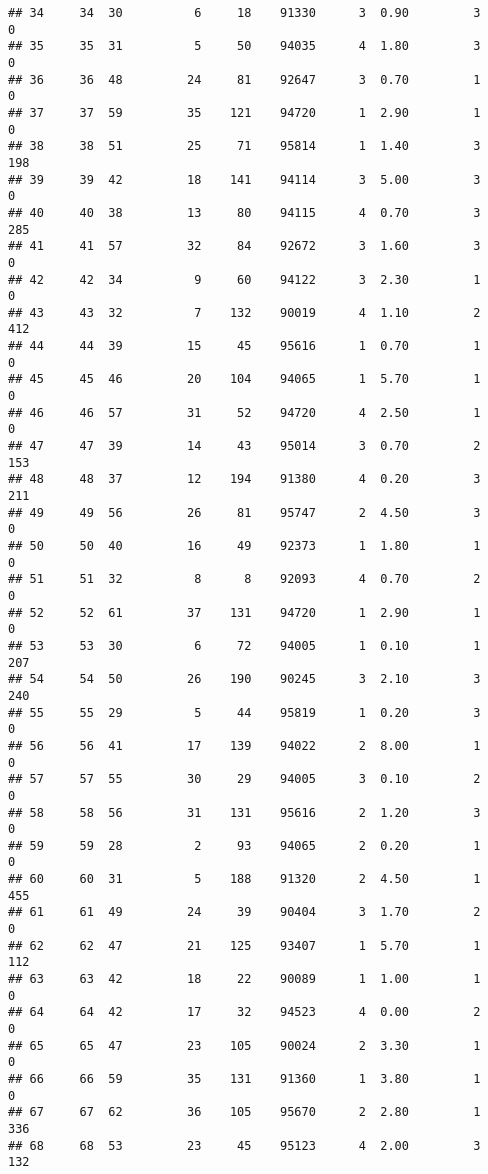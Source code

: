 \documentclass[
]{article}
\begin{document}
\begin{verbatim}
## 34     34  30          6     18    91330      3  0.90         3        0
## 35     35  31          5     50    94035      4  1.80         3        0
## 36     36  48         24     81    92647      3  0.70         1        0
## 37     37  59         35    121    94720      1  2.90         1        0
## 38     38  51         25     71    95814      1  1.40         3      198
## 39     39  42         18    141    94114      3  5.00         3        0
## 40     40  38         13     80    94115      4  0.70         3      285
## 41     41  57         32     84    92672      3  1.60         3        0
## 42     42  34          9     60    94122      3  2.30         1        0
## 43     43  32          7    132    90019      4  1.10         2      412
## 44     44  39         15     45    95616      1  0.70         1        0
## 45     45  46         20    104    94065      1  5.70         1        0
## 46     46  57         31     52    94720      4  2.50         1        0
## 47     47  39         14     43    95014      3  0.70         2      153
## 48     48  37         12    194    91380      4  0.20         3      211
## 49     49  56         26     81    95747      2  4.50         3        0
## 50     50  40         16     49    92373      1  1.80         1        0
## 51     51  32          8      8    92093      4  0.70         2        0
## 52     52  61         37    131    94720      1  2.90         1        0
## 53     53  30          6     72    94005      1  0.10         1      207
## 54     54  50         26    190    90245      3  2.10         3      240
## 55     55  29          5     44    95819      1  0.20         3        0
## 56     56  41         17    139    94022      2  8.00         1        0
## 57     57  55         30     29    94005      3  0.10         2        0
## 58     58  56         31    131    95616      2  1.20         3        0
## 59     59  28          2     93    94065      2  0.20         1        0
## 60     60  31          5    188    91320      2  4.50         1      455
## 61     61  49         24     39    90404      3  1.70         2        0
## 62     62  47         21    125    93407      1  5.70         1      112
## 63     63  42         18     22    90089      1  1.00         1        0
## 64     64  42         17     32    94523      4  0.00         2        0
## 65     65  47         23    105    90024      2  3.30         1        0
## 66     66  59         35    131    91360      1  3.80         1        0
## 67     67  62         36    105    95670      2  2.80         1      336
## 68     68  53         23     45    95123      4  2.00         3      132

\end{verbatim}
\end{document}
